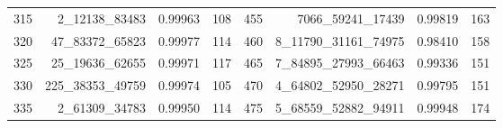 \documentclass[preprint]{sigplanconf}
\begin{document}
\begin{table}
\begin{center}
\begin{tabular}{|c r c c| c r c c|}
            315             & 2\_12138\_83483   & 0.99963          & 108             & 455          & 7066\_59241\_17439     & 0.99819          & 163             \\
            320             & 47\_83372\_65823  & 0.99977          & 114             & 460          & 8\_11790\_31161\_74975 & 0.98410          & 158             \\
            325             & 25\_19636\_62655  & 0.99971          & 117             & 465          & 7\_84895\_27993\_66463 & 0.99336          & 151             \\
            330             & 225\_38353\_49759 & 0.99974          & 105             & 470          & 4\_64802\_52950\_28271 & 0.99795          & 151             \\
            335             & 2\_61309\_34783   & 0.99950          & 114             & 475          & 5\_68559\_52882\_94911 & 0.99948          & 174             \\
            \hline
        \end{tabular}
        \label{table:appendix}
    \end{center}
\end{table}


\end{document}
